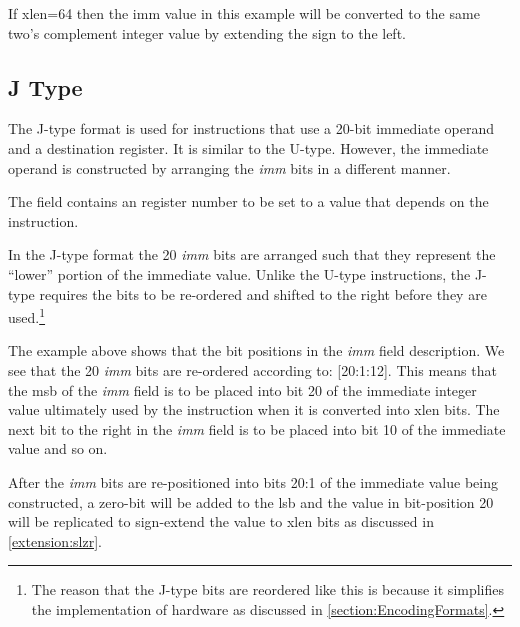 If \Gls{xlen}=64 then the imm value in this example will be converted to the
same two's complement integer value by extending the sign to the left.


\subsection{J Type}
\label{insnformat:jtype}

The J-type format is used for instructions that use a 20-bit immediate operand
and a destination register.  It is similar to the U-type.  However, the immediate
operand is constructed by arranging the {\em imm} bits in a different manner.


The  field contains an  register number to be set to a value that
depends on the instruction.


In the J-type format the 20 {\em imm} bits are arranged such 
that they represent the ``lower'' portion of the immediate value.  Unlike 
the U-type 
instructions, the J-type requires the bits to be re-ordered and shifted 
to the right before they are used.\footnote{The reason that the J-type 
bits are reordered like this is because it simplifies the implementation of 
hardware as discussed in \autoref{section:EncodingFormats}.}

The example above shows that the bit positions in the {\em imm} field 
description.  We see that the 20 {\em imm} bits are re-ordered according to: 
[20:1:12].  
This means that the \acrshort{msb} of the {\em imm} field is to be placed 
into bit 20 of the immediate integer value ultimately used by the instruction 
when it is converted into \Gls{xlen} bits.  
The next bit to the right in the {\em imm} field is to be placed into bit 10 of 
the immediate value and so on.

After the {\em imm} bits are re-positioned into bits 20:1 of the immediate value
being constructed, a zero-bit will be added to the \acrshort{lsb} 
and the value in bit-position 20 will be replicated to sign-extend the 
value to \Gls{xlen} bits as discussed in \autoref{extension:slzr}.

